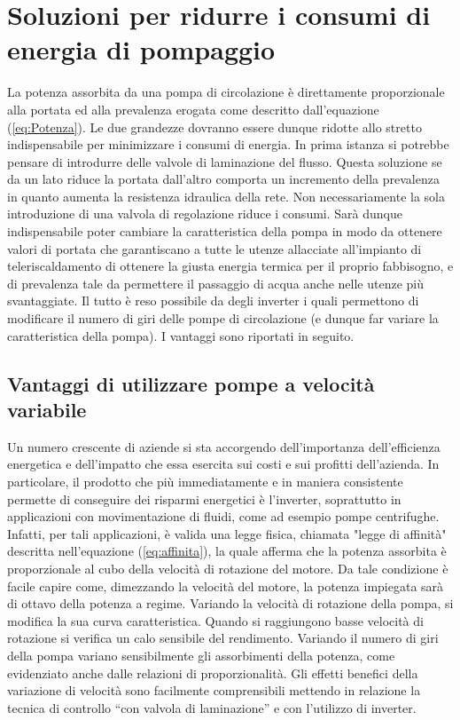 \documentclass[laurea,oneside,11pt]{USiena_tesiLM3}
\begin{document}
\section{Soluzioni per ridurre i consumi di energia di pompaggio}
La potenza assorbita da una pompa di circolazione è direttamente proporzionale alla portata ed alla prevalenza erogata come descritto dall'equazione (\ref{eq:Potenza}). Le due grandezze dovranno essere dunque ridotte allo stretto indispensabile per minimizzare i consumi di energia.
In prima istanza si potrebbe pensare di introdurre delle valvole di laminazione del flusso. Questa soluzione se da un lato riduce la portata dall'altro comporta un incremento della prevalenza in quanto aumenta la resistenza idraulica della rete.
Non necessariamente la sola introduzione di una valvola di regolazione riduce i consumi. Sarà dunque indispensabile poter cambiare la caratteristica della pompa in modo da ottenere  valori di portata che garantiscano a tutte le utenze allacciate all'impianto di teleriscaldamento di ottenere la giusta energia termica per il proprio fabbisogno, e di prevalenza tale da permettere il passaggio di acqua anche nelle utenze più svantaggiate.
Il tutto è reso possibile da degli inverter i quali permettono di modificare il numero di giri delle pompe di circolazione (e dunque far variare la caratteristica della pompa). I vantaggi sono riportati in seguito.

\subsection{Vantaggi di utilizzare pompe a velocità variabile}
Un numero crescente di aziende si sta accorgendo dell'importanza dell'efficienza energetica e dell'impatto che essa esercita sui costi e sui profitti dell'azienda.
In particolare, il prodotto che più immediatamente e in maniera consistente permette di conseguire dei risparmi energetici è l'inverter, soprattutto in applicazioni con movimentazione di fluidi, come ad esempio pompe centrifughe. Infatti, per tali applicazioni, è valida una legge fisica, chiamata "legge di affinità" descritta nell'equazione (\ref{eq:affinita}), la quale afferma che la potenza assorbita è proporzionale al cubo della velocità di rotazione del motore. Da tale condizione è facile capire come, dimezzando la velocità del motore, la potenza impiegata sarà di ottavo della potenza a regime. 
Variando la velocità di rotazione della pompa, si modifica la sua curva caratteristica. Quando si raggiungono basse velocità di rotazione si verifica un calo sensibile del rendimento. Variando il numero di giri della pompa variano sensibilmente gli assorbimenti della potenza, come evidenziato anche dalle relazioni di proporzionalità. Gli effetti benefici della variazione di velocità sono facilmente comprensibili mettendo in relazione la tecnica di controllo “con valvola di laminazione” e con l’utilizzo di inverter. 
\end{document}
